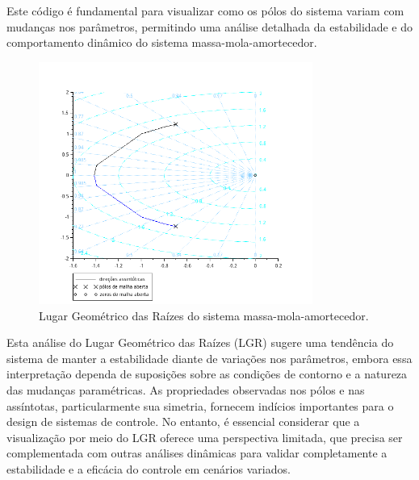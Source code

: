 Este código é fundamental para visualizar como os pólos do sistema variam com mudanças nos parâmetros, permitindo uma análise detalhada da estabilidade e do comportamento dinâmico do sistema massa-mola-amortecedor.

\begin{figure}[h]
    \centering
    \includegraphics[width=0.8\textwidth]{atividades/7-atividade/assets/lgr.png}
    \caption{Lugar Geométrico das Raízes do sistema massa-mola-amortecedor.}
    \label{fig:LGR}
\end{figure}

Esta análise do Lugar Geométrico das Raízes (LGR) sugere uma tendência do sistema de manter a estabilidade diante de variações nos parâmetros, embora essa interpretação dependa de suposições sobre as condições de contorno e a natureza das mudanças paramétricas. As propriedades observadas nos pólos e nas assíntotas, particularmente sua simetria, fornecem indícios importantes para o design de sistemas de controle. No entanto, é essencial considerar que a visualização por meio do LGR oferece uma perspectiva limitada, que precisa ser complementada com outras análises dinâmicas para validar completamente a estabilidade e a eficácia do controle em cenários variados.

